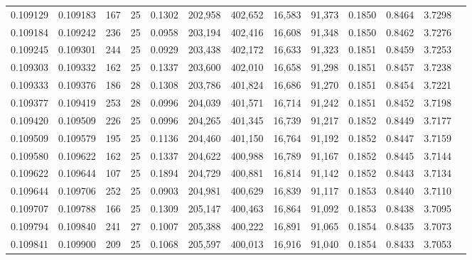 \begin{tabular}{rrrrrrrrrrrrr}
0.109129 & 0.109183 & 167 &  25 &                                     0.1302 & 202,958 & 402,652 &  16,583 &  91,373 & 0.1850 & 0.8464 & 3.7298 \\
0.109184 & 0.109242 & 236 &  25 &                                     0.0958 & 203,194 & 402,416 &  16,608 &  91,348 & 0.1850 & 0.8462 & 3.7276 \\
0.109245 & 0.109301 & 244 &  25 &                                     0.0929 & 203,438 & 402,172 &  16,633 &  91,323 & 0.1851 & 0.8459 & 3.7253 \\
0.109303 & 0.109332 & 162 &  25 &                                     0.1337 & 203,600 & 402,010 &  16,658 &  91,298 & 0.1851 & 0.8457 & 3.7238 \\
0.109333 & 0.109376 & 186 &  28 &                                     0.1308 & 203,786 & 401,824 &  16,686 &  91,270 & 0.1851 & 0.8454 & 3.7221 \\
0.109377 & 0.109419 & 253 &  28 &                                     0.0996 & 204,039 & 401,571 &  16,714 &  91,242 & 0.1851 & 0.8452 & 3.7198 \\
0.109420 & 0.109509 & 226 &  25 &                                     0.0996 & 204,265 & 401,345 &  16,739 &  91,217 & 0.1852 & 0.8449 & 3.7177 \\
0.109509 & 0.109579 & 195 &  25 &                                     0.1136 & 204,460 & 401,150 &  16,764 &  91,192 & 0.1852 & 0.8447 & 3.7159 \\
0.109580 & 0.109622 & 162 &  25 &                                     0.1337 & 204,622 & 400,988 &  16,789 &  91,167 & 0.1852 & 0.8445 & 3.7144 \\
0.109622 & 0.109644 & 107 &  25 &                                     0.1894 & 204,729 & 400,881 &  16,814 &  91,142 & 0.1852 & 0.8443 & 3.7134 \\
0.109644 & 0.109706 & 252 &  25 &                                     0.0903 & 204,981 & 400,629 &  16,839 &  91,117 & 0.1853 & 0.8440 & 3.7110 \\
0.109707 & 0.109788 & 166 &  25 &                                     0.1309 & 205,147 & 400,463 &  16,864 &  91,092 & 0.1853 & 0.8438 & 3.7095 \\
0.109794 & 0.109840 & 241 &  27 &                                     0.1007 & 205,388 & 400,222 &  16,891 &  91,065 & 0.1854 & 0.8435 & 3.7073 \\
0.109841 & 0.109900 & 209 &  25 &                                     0.1068 & 205,597 & 400,013 &  16,916 &  91,040 & 0.1854 & 0.8433 & 3.7053 \\

\end{tabular}
